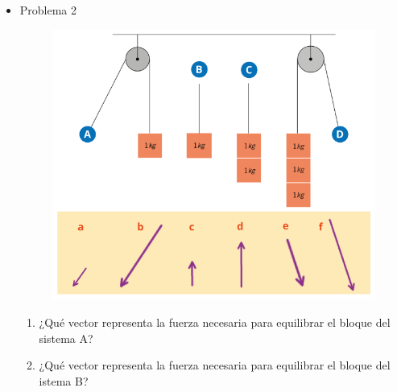 \documentclass[11pt]{book}
\begin{document}
\begin{itemize}
\begin{boxK}
\begin{minipage}[t]{0.3\linewidth}
\begin{figure}[H]
                  \end{figure}
              \end{minipage}
          \end{boxK}

    \item Problema 2
          \begin{boxK}
              \begin{figure}[H]
                  \centering
                  \includegraphics[width=0.6\linewidth]{poleas01.png}
              \end{figure}
              \footnotesize
              \begin{enumerate}
                  \item ¿Qué vector representa la fuerza necesaria para equilibrar el bloque del
                        sistema A?\\
                  \item ¿Qué vector representa la fuerza necesaria para equilibrar el bloque del
                        istema B?\\
\end{enumerate}
\end{boxK}
\end{itemize}
\end{document}
